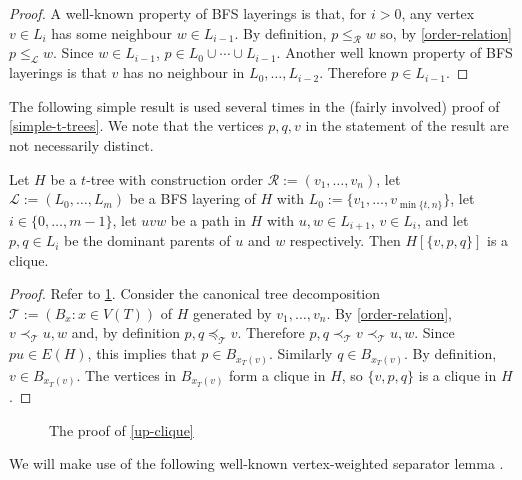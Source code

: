 \documentclass[kpfonts]{patmorin}
\theoremstyle{named}
\begin{document}
\begin{proof}
    A well-known property of BFS layerings is that, for $i>0$, any vertex $v\in L_{i}$ has some neighbour $w\in L_{i-1}$.  By definition, $p\le_\mathcal{R} w$ so, by \cref{order-relation} $p\le_\mathcal{L} w$. Since $w\in L_{i-1}$, $p\in L_0\cup\cdots\cup L_{i-1}$.  Another well known property of BFS layerings is that $v$ has no neighbour in $L_0,\ldots,L_{i-2}$.  Therefore $p\in L_{i-1}$.
\end{proof}

The following simple result is used several times in the (fairly involved) proof of \cref{simple-t-trees}.  We note that the vertices $p,q,v$ in the statement of the result are not necessarily distinct.

\begin{obs}\label{up-clique}
    Let $H$ be a $t$-tree with construction order $\mathcal{R}:=(v_1,\ldots,v_n)$, let $\mathcal{L}:=(L_0,\ldots,L_m)$ be a BFS layering of $H$ with $L_0:=\{v_1,\ldots,v_{\min\{t,n\}}\}$, let $i\in\{0,\ldots,m-1\}$, let $uvw$ be a path in $H$ with $u,w\in L_{i+1}$, $v\in L_{i}$, and let $p,q\in L_{i}$ be the dominant parents of $u$ and $w$ respectively.  Then $H[\{v,p,q\}]$ is a clique.
\end{obs}


\begin{proof}
    Refer to \cref{up-clique-figure}. Consider the canonical tree decomposition $\mathcal{T}:=(B_x:x\in V(T))$ of $H$ generated by $v_1,\ldots,v_n$.  By \cref{order-relation}, $v\prec_{\mathcal{T}} u,w$ and, by definition $p,q\preceq_{\mathcal{T}} v$.  Therefore $p,q\prec_{\mathcal{T}} v\prec_{\mathcal{T}} u,w$.  Since $pu\in E(H)$, this implies that $p\in B_{x_T(v)}$.  Similarly $q\in B_{x_T(v)}$.  By definition, $v\in B_{x_T(v)}$.  The vertices in $B_{x_T(v)}$ form a clique in $H$, so $\{v,p,q\}$ is a clique in $H$.
\end{proof}

\begin{figure}
    \caption{The proof of \cref{up-clique}}
    \label{up-clique-figure}
\end{figure}

We will make use of the following well-known vertex-weighted separator lemma \cite{Citation}.
\end{document}

